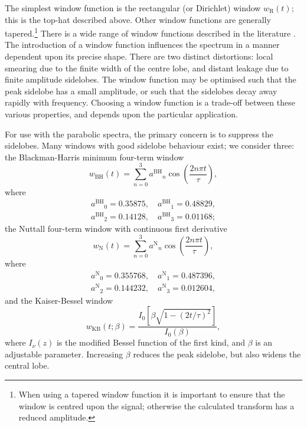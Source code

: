 \documentclass[useAMS,usedcolumn,usegraphicx,usenatbib]{mn2e}
\newcommand{\sub}[1]{\ensuremath{_\mathrm{#1}}}
\newcommand{\super}[1]{\ensuremath{^\mathrm{#1}}}
\begin{document}
The simplest window function is the rectangular (or Dirichlet) window $w\sub{R}(t)$; this is the top-hat described above. Other window functions are generally tapered.\footnote{When using a tapered window function it is important to ensure that the window is centred upon the signal; otherwise the calculated transform has a reduced amplitude.} There is a wide range of window functions described in the literature \citep*{Harris1978,Kaiser1980,Nuttall1981,McKechan2010}. The introduction of a window function influences the spectrum in a manner dependent upon its precise shape. There are two distinct distortions: local smearing due to the finite width of the centre lobe, and distant leakage due to finite amplitude sidelobes. The window function may be optimised such that the peak sidelobe has a small amplitude, or such that the sidelobes decay away rapidly with frequency. Choosing a window function is a trade-off between these various properties, and depends upon the particular application.

For use with the parabolic spectra, the primary concern is to suppress the sidelobes. Many windows with good sidelobe behaviour exist; we consider three: the Blackman-Harris minimum four-term window \citep{Harris1978, Nuttall1981}
\begin{equation}
w\sub{BH}(t) = \sum_{n=0}^{3} a\super{BH}_n\cos\left(\frac{2n\pi t}{\tau}\right),
\end{equation}
where
\begin{equation}
\begin{split}
a\super{BH}_0 = 0.35875, \quad a\super{BH}_1 = 0.48829,\\
a\super{BH}_2 = 0.14128, \quad a\super{BH}_3 = 0.01168;
\end{split}
\end{equation}
the Nuttall four-term window with continuous first derivative \citep{Nuttall1981}
\begin{equation}
w\sub{N}(t) = \sum_{n=0}^{3} a\super{N}_n\cos\left(\frac{2n\pi t}{\tau}\right),
\end{equation}
where
\begin{equation}
\begin{split}
a\super{N}_0 = 0.355768, \quad a\super{N}_1 = 0.487396,\\
a\super{N}_2 = 0.144232, \quad a\super{N}_3 = 0.012604,
\end{split}
\end{equation}
and the Kaiser-Bessel window \citep{Harris1978, Kaiser1980}
\begin{equation}
w\sub{KB}(t;\beta) = \frac{I_0\left[\beta\sqrt{1 - (2 t/\tau)^2}\right]}{I_0(\beta)},
\end{equation}
where $I_\nu(z)$ is the modified Bessel function of the first kind, and $\beta$ is an adjustable parameter. Increasing $\beta$ reduces the peak sidelobe, but also widens the central lobe.
\end{document}
